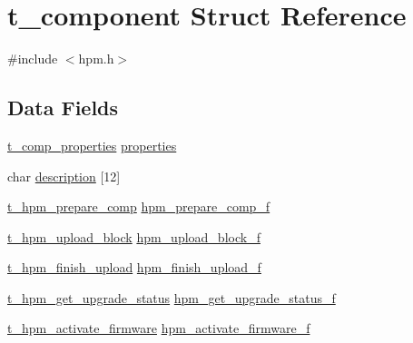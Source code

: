 \hypertarget{structt__component}{\section{t\-\_\-component Struct Reference}
\label{structt__component}
}


{\ttfamily \#include $<$hpm.\-h$>$}

\subsection*{Data Fields}
\begin{DoxyCompactItemize}
\item 
\hyperlink{hpm_8h_a3720b1297f01ef39433435794ddc62f2}{t\-\_\-comp\-\_\-properties} \hyperlink{structt__component_a4a9dc32ee7875e3d8f17a446120566d6}{properties}
\item 
char \hyperlink{structt__component_acc4de5922fd67899c67e936ac117177c}{description} \mbox{[}12\mbox{]}
\item 
\hyperlink{hpm_8h_aa765d7ce9ad8912bd0f7043d2858c672}{t\-\_\-hpm\-\_\-prepare\-\_\-comp} \hyperlink{structt__component_a3ed3390ba798a04c4819e69ed900ed42}{hpm\-\_\-prepare\-\_\-comp\-\_\-f}
\item 
\hyperlink{hpm_8h_a4e391c463111b09f9a9c2a927a67124d}{t\-\_\-hpm\-\_\-upload\-\_\-block} \hyperlink{structt__component_a0329631e004cffd84699163d8b9cf39b}{hpm\-\_\-upload\-\_\-block\-\_\-f}
\item 
\hyperlink{hpm_8h_aee8d22bc94c845a4ec709322ec6d0031}{t\-\_\-hpm\-\_\-finish\-\_\-upload} \hyperlink{structt__component_a70d18a39521db9b8a788f02bea2aca38}{hpm\-\_\-finish\-\_\-upload\-\_\-f}
\item 
\hyperlink{hpm_8h_aa193a8345cf40e48a5acb6f2567f1e61}{t\-\_\-hpm\-\_\-get\-\_\-upgrade\-\_\-status} \hyperlink{structt__component_a4db7e7a190ba8d08e86b89e2afb90139}{hpm\-\_\-get\-\_\-upgrade\-\_\-status\-\_\-f}
\item 
\hyperlink{hpm_8h_a9c7222bf212f56aa65480354915b67cd}{t\-\_\-hpm\-\_\-activate\-\_\-firmware} \hyperlink{structt__component_a45691c6c4e01520c8ff8153a499c4167}{hpm\-\_\-activate\-\_\-firmware\-\_\-f}
\end{DoxyCompactItemize}


